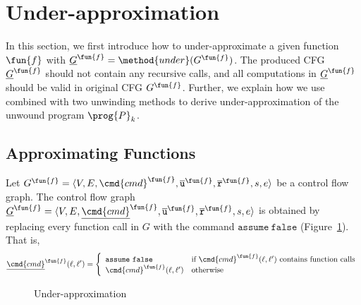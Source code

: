 
\section{Under-approximation}\label{sec:under-approximation}
In this section, we first introduce how to under-approximate a given function
$\fun{f}$ with $\underline{G}^\fun{f}=\method{under}(G^\fun{f})$.
The produced CFG $\underline{G}^\fun{f}$ should not contain any recursive calls,
and all computations in $\underline{G}^\fun{f}$ should be valid in original CFG
$G^\fun{f}$.
Further, we explain how we use  combined with two unwinding
methods to derive under-approximation of the unwound program $\prog{P}_k$.


\subsection{Approximating Functions}
Let $G^\fun{f} = \langle V, E, \cmd{cmd}^\fun{f}, \overline{\texttt{u}}^\fun{f},
\overline{\texttt{r}}^\fun{f},s,e \rangle$ be a control flow graph.
The control flow graph $\underline{G}^\fun{f} = \langle V, E,
\underline{\cmd{cmd}}^\fun{f}, \overline{\texttt{u}}^\fun{f},
\overline{\texttt{r}}^\fun{f},s,e \rangle$ is obtained by replacing every
function call in $G$ with the command $\mathtt{assume\ false}$
(Figure~\ref{figure:under-approximation}).
That is,
\begin{equation*}
  \underline{\cmd{cmd}}^\fun{f} (\ell, \ell') =
  \left\{
    \begin{array}{ll}
      \mathtt{assume\ false} &
      \text{if } \cmd{cmd}^\fun{f} (\ell, \ell')
      \text{ contains function calls}\\
      \cmd{cmd}^\fun{f} (\ell, \ell') &
      \text{otherwise}
    \end{array}
  \right.
\end{equation*}

\begin{figure}[t]
  \centering

  \caption{Under-approximation}
  \label{figure:under-approximation}
\end{figure}

